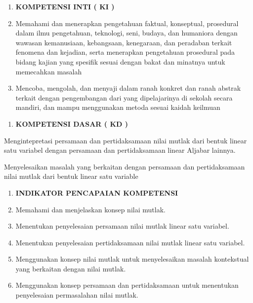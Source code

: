 \documentclass[11pt,fleqn]{book} %
\begin{document}
\begin{enumerate}
\item  \textbf{KOMPETENSI INTI ( KI )}

\item \textbf{ }Memahami dan menerapkan pengetahuan faktual, konseptual, prosedural dalam ilmu pengetahuan, teknologi, seni, budaya, dan humaniora dengan wawasan kemanusiaan, kebangsaan, kenegaraan, dan peradaban terkait fenomena dan kejadian, serta menerapkan pengetahuan prosedural pada bidang kajian yang spesifik sesuai dengan bakat dan minatnya untuk memecahkan masalah

\item  Mencoba, mengolah, dan menyaji dalam ranah konkret dan ranah abstrak  terkait dengan pengembangan dari yang dipelajarinya di sekolah secara mandiri, dan mampu menggunakan metoda sesuai kaidah keilmuan
\end{enumerate}

\noindent 

\begin{enumerate}
\item  \textbf{KOMPETENSI DASAR ( KD )}
\end{enumerate}

  Mengintepretasi persamaan dan pertidaksamaan nilai mutlak dari bentuk linear satu variabel dengan persamaan dan pertidaksamaan linear Aljabar lainnya.

 Menyelesaikan masalah yang berkaitan dengan persamaan dan pertidaksamaan nilai mutlak dari bentuk linear satu variable

\noindent 

\begin{enumerate}
\item  \textbf{INDIKATOR PENCAPAIAN KOMPETENSI}

\item \textbf{ }Memahami dan menjelaskan konsep nilai mutlak.

\item  Menentukan penyelesaian persamaan nilai mutlak linear satu variabel.

\item  Menentukan penyelesaian pertidaksamaan nilai mutlak linear satu variabel.

\item  Menggunakan konsep nilai mutlak untuk menyelesaikan masalah kontekstual yang berkaitan dengan nilai mutlak.

\item  Menggunakan konsep persamaan dan pertidaksamaan untuk menentukan penyelesaian permasalahan nilai mutlak.
\end{enumerate}
\end{document}
